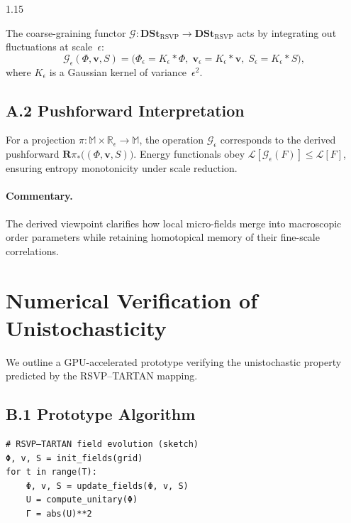 \documentclass[12pt,a4paper]{article}
\begin{document}
\begin{spacing}{1.15}
\begin{definition}
The coarse-graining functor
$\mathcal{G}\colon \mathbf{DSt}_{\text{RSVP}}\to
\mathbf{DSt}_{\text{RSVP}}$
acts by integrating out fluctuations at scale~$\epsilon$:
\[
\mathcal{G}_\epsilon(\Phi,\mathbf{v},S)
=
\Big(
\Phi_\epsilon = K_\epsilon * \Phi,\;
\mathbf{v}_\epsilon = K_\epsilon * \mathbf{v},\;
S_\epsilon = K_\epsilon * S
\Big),
\]
where $K_\epsilon$ is a Gaussian kernel of variance~$\epsilon^2$.
\end{definition}

\subsection*{A.2 Pushforward Interpretation}

For a projection $\pi\colon \mathbb{M}\!\times\!\mathbb{R}_\epsilon
\to\mathbb{M}$,
the operation $\mathcal{G}_\epsilon$ corresponds to the derived
pushforward
$\mathbf{R}\pi_*\big((\Phi,\mathbf{v},S)\big)$.
Energy functionals obey
$\mathcal{L}[\mathcal{G}_\epsilon(F)] \le
\mathcal{L}[F]$,
ensuring entropy monotonicity under scale reduction.

\paragraph{Commentary.}
The derived viewpoint clarifies how local micro-fields merge into
macroscopic order parameters while retaining homotopical memory of
their fine-scale correlations.

\bigskip

\section{Numerical Verification of Unistochasticity}

We outline a GPU-accelerated prototype verifying the
unistochastic property predicted by the RSVP–TARTAN mapping.

\subsection*{B.1 Prototype Algorithm}

\begin{verbatim}
# RSVP–TARTAN field evolution (sketch)
Φ, v, S = init_fields(grid)
for t in range(T):
    Φ, v, S = update_fields(Φ, v, S)
    U = compute_unitary(Φ)
    Γ = abs(U)**2
\end{verbatim}


\end{spacing}
\end{document}
